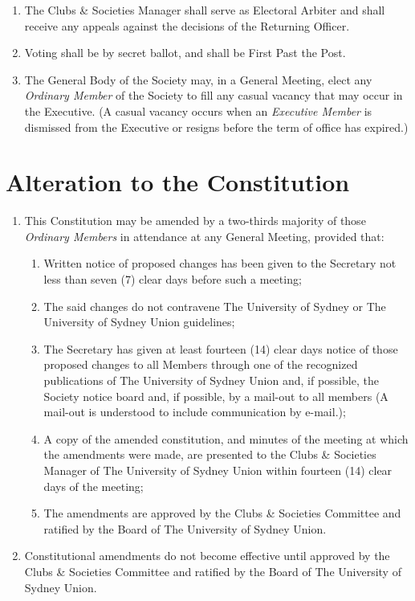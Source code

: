 \documentclass[11pt]{article}
\begin{document}
\begin{enumerate}[\thesection .1]
    \item The Clubs \& Societies Manager shall serve as Electoral Arbiter and shall receive any appeals against the decisions of the Returning Officer.
    \item Voting shall be by secret ballot, and shall be First Past the Post.
    \item The General Body of the Society may, in a General Meeting, elect any \textit{Ordinary Member} of the Society to fill any casual vacancy that may occur in the Executive. (A casual vacancy occurs when an \textit{Executive Member} is dismissed from the Executive or resigns before the term of office has expired.)
\end{enumerate}

\section{Alteration to the Constitution}
\begin{enumerate}[\thesection .1]
    \item This Constitution may be amended by a two-thirds majority of those \textit{Ordinary Members} in attendance at any General Meeting, provided that:
    \begin{enumerate}[\hspace{5mm}1.]
        \item Written notice of proposed changes has been given to the Secretary not less than seven (7) clear days before such a meeting;
        \item The said changes do not contravene The University of Sydney or The University of Sydney Union guidelines;
        \item The Secretary has given at least fourteen (14) clear days notice of those proposed changes to all Members through one of the recognized publications of The University of Sydney Union and, if possible, the Society notice board and, if possible, by a mail-out to all members (A mail-out is understood to include communication by e-mail.);
        \item A copy of the amended constitution, and minutes of the meeting at which the amendments were made, are presented to the Clubs \& Societies Manager of The University of Sydney Union within fourteen (14) clear days of the meeting;
        \item The amendments are approved by the Clubs \& Societies Committee and ratified by the Board of The University of Sydney Union.
    \end{enumerate}
    \item Constitutional amendments do not become effective until approved by the Clubs \& Societies Committee and ratified by the Board of The University of Sydney Union.
\end{enumerate}
\end{document}
